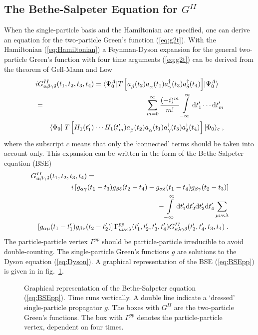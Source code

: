 \subsection{The Bethe-Salpeter Equation for $G^{II}$\label{sec:lrcBSE}}
When the single-particle basis and the Hamiltonian are specified, one can 
derive an equation for the two-particle Green's function 
(\ref{eq:g2t}). 
%
With the Hamiltonian (\ref{eq:Hamiltonian}) 
a Feynman-Dyson expansion for the general two-particle Green's function with
four time arguments (\ref{eq:g2t}) 
can be derived from the theorem of Gell-Mann and Low\cite{FW71,AGD63}
%
	\begin{eqnarray}
	\lefteqn{%
		iG^{II}_{\alpha\beta\gamma\delta}
		         (t_1, t_2, t_3, t_4) 
	=
		\ME< \Psi^A_0 | 
		T \left[
		\Oa{\beta}(t_2) \Oa{\alpha}(t_1)
		\Oc{\gamma}(t_3) \Oc{\delta}(t_4)
		\right]
		|\Psi^A_0 >
	} && 
	\label{eq:GMLG} \\
	&=&
		\sum_{m=0}^{\infty}
		\frac{(-i)^m}{m!}
 		\int\limits_{-\infty}^{\infty} 
		{\rm d} t'_1 \cdots {\rm d} t'_m
	\nonumber\\
	&&
		\inp< \Phi_0 | 
			T\left[
				H_1(t'_1)\cdots H_1(t'_m)
				\Oa{\beta}(t_2) \Oa{\alpha}(t_1)
				\Oc{\gamma}(t_3) \Oc{\delta}(t_4)
			 \right]
		    | \Phi_0 >_c 
	\nonumber
	\;,
	\end{eqnarray}
%
where the subscript $c$ means that only the `connected' terms should
be taken into account only.
This expansion can be written in the form of  the 
Bethe-Salpeter equation (BSE) 
%
	\begin{eqnarray}
	\lefteqn{%
		G^{II}_{\alpha\beta\gamma\delta}
		         (t_1, t_2, t_3, t_4) 
	=} && \label{eq:BSEpp} \\
	&&
	i\left[
		g_{\alpha\gamma}(t_1-t_3)
		g_{\beta\delta}(t_2-t_4)
	-
		g_{\alpha\delta}(t_1-t_4)
		g_{\beta\gamma}(t_2-t_3)
	\right]
	\nonumber \\
	&&
	-
 		\int\limits_{-\infty}^{\infty} 
		{\rm d} t'_1 {\rm d} t'_2 {\rm d} t'_3 {\rm d} t'_4
		\sum_{\mu\nu\kappa\lambda}
	\nonumber \\
	&&
	\left[
		g_{\alpha\mu}(t_1-t'_1)
		g_{\beta\nu}(t_2-t'_2)
	\right]
		\Gamma^{pp}_{\mu\nu\kappa\lambda}
		(t'_1, t'_2, t'_3, t'_4)
		G^{II}_{\kappa\lambda\gamma\delta}
		(t'_3, t'_4, t_3, t_4) 
	\nonumber
	\;.
	\end{eqnarray}
%
The particle-particle vertex $\Gamma^{pp}$ should be particle-particle 
irreducible to avoid double-counting\cite{Mi67}.
The single-particle Green's functions $g$ are solutions to the 
Dyson equation (\ref{eq:Dyson}).
A graphical representation of the BSE (\ref{eq:BSEpp}) is given in
in fig.~\ref{fig:BSEpp}.
\begin{figure}
\centerline{
}
\caption[]{Graphical representation of the Bethe-Salpeter equation 
(\ref{eq:BSEpp}). Time runs vertically.
A double line indicate a `dressed' single-particle propagator $g$. The 
boxes with $G^{II}$ are the two-particle Green's functions. The box with
$\Gamma^{pp}$ denotes the particle-particle vertex, dependent on four
times.
\label{fig:BSEpp}
}
\end{figure}

